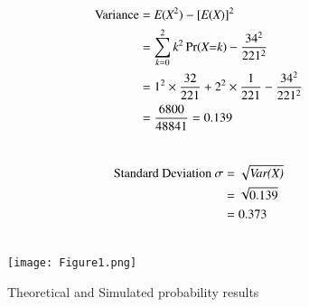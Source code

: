 \documentclass[journal,12pt,twocolumn]{IEEEtran}
\begin{document}
\begin{align}
 \text{Variance} &=\emph{E}(\emph{X}^2) - [\emph{E}(\emph{X})]^2\\ 
                  &= \sum_{\emph{k}=0}^{2} \emph{k}^2 \Pr(\emph{X=k}) - \frac{34^2}{221^2}\\ 
                  &= 1^2\times\frac{32}{221} + 2^2\times\frac{1}{221} - \frac{34^2}{221^2}\\\vspace{0.1cm}
                  &= \frac{6800}{48841} = 0.139\\ \nonumber
\end{align}

\begin{align}
 \text{Standard Deviation }\sigma &= \sqrt{\emph{Var(X)}}\\  
&= \sqrt{0.139}\\ &= 0.373\\ \nonumber
\end{align}

\newpage
\begin{figure}[h!]
    \texttt{[image: Figure1.png]}
    \caption{\large Theoretical and Simulated probability results}
    \label{Figure 1}
\end{figure}
\end{document}
